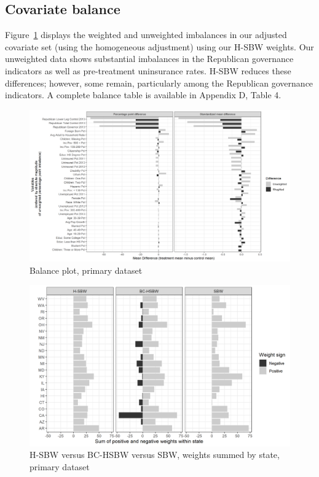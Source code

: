 \documentclass[aoas]{imsart}
\theoremstyle{plain}
\theoremstyle{remark}
\begin{document}
\subsection{Covariate balance}

Figure~\ref{fig:loveplotc1} displays the weighted and unweighted imbalances in our adjusted covariate set (using the homogeneous adjustment) using our H-SBW weights. Our unweighted data shows substantial imbalances in the Republican governance indicators as well as pre-treatment uninsurance rates. H-SBW reduces these differences; however, some remain, particularly among the Republican governance indicators. A complete balance table is available in Appendix D, Table 4. 

\begin{figure}[H]
\begin{center}
    \caption{Balance plot, primary dataset}
    \label{fig:loveplotc1}
    \includegraphics[scale=0.45]{01_Plots/balance-plot-all-etuc1.png}
\end{center}
\end{figure}

\begin{figure}[H]
\begin{center}
    \caption{H-SBW versus BC-HSBW versus SBW, weights summed by state, primary dataset}
    \label{fig:sbwvhsbw1}
    \includegraphics[scale=0.55]{01_Plots/weights-by-state-sbw-hsbw-c1.png}
\end{center}
\end{figure}
\end{document}
